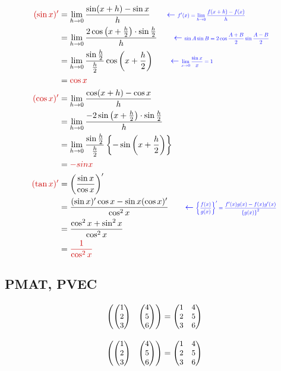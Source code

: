 \documentclass[../main]{subfiles}
\begin{document}
\begin{code}[language=tex]
    \begin{align*}
        \EMM{(\sin x)'} &= \lim_{h\to 0}\frac{\sin(x+h)-\sin x}{h}
        \qquad \EXPRNOTE{f'(x) = \lim_{h\to 0}\frac{f(x+h)-f(x)}{h}} \\
        &= \lim_{h\to 0}\frac{2\cos\left(x+\frac{h}{2}\right)\cdot\sin\frac{h}{2}}{h}
        \qquad \EXPRNOTE{\sin A\sin B = 2\cos\frac{A+B}{2}\sin\frac{A-B}{2}} \\
        &= \lim_{h\to 0}\frac{\sin\frac{h}{2}}{\frac{h}{2}}\cos\left(x+\frac{h}{2}\right)
        \qquad \EXPRNOTE{\lim_{x\to 0}\frac{\sin x}{x} = 1} \\
        &= \EMM{\cos x} \\
        \EMM{(\cos x)'} &= \lim_{h\to 0}\frac{\cos(x+h)-\cos x}{h} \\
        &= \lim_{h\to 0}\frac{-2\sin\left(x+\frac{h}{2}\right)\cdot\sin\frac{h}{2}}{h} \\
        &= \lim_{h\to 0}\frac{\sin\frac{h}{2}}{\frac{h}{2}}
        \left\{-\sin\left(x+\frac{h}{2}\right)\right\} \\
        &= \EMM{-sin x} \\
        \EMM{(\tan x)'} &= \left(\frac{\sin x}{\cos x}\right)' \\
        &= \frac{(\sin x)'\cos x - \sin x(\cos x)'}{\cos^2 x}
        \qquad \EXPRNOTE{
            \left\{
                \frac{f(x)}{g(x)}
            \right\}' = \frac{f'(x)g(x)-f(x)g'(x)}
            {\left\{g(x)\right\}^2}
        } \\
        &= \frac{\cos^2 x + \sin^2 x}{\cos^2 x} \\
        &= \EMM{\frac{1}{\cos^2 x}}
    \end{align*}
\end{code}

\leaderfill
\subsection{PMAT, PVEC}

\[
    {\small\begin{pmatrix}{}{\small\begin{pmatrix}1\\2\\3\end{pmatrix}}&{\small\begin{pmatrix}4\\5\\6\end{pmatrix}}\end{pmatrix}} = 
    {\small\begin{pmatrix}{}1&4\\2&5\\3&6\end{pmatrix}}
\]
\begin{code}[language=tex]
\[
    {\small\begin{pmatrix}{}{\small\begin{pmatrix}1\\2\\3\end{pmatrix}}&{\small\begin{pmatrix}4\\5\\6\end{pmatrix}}\end{pmatrix}} = 
    {\small\begin{pmatrix}{}1&4\\2&5\\3&6\end{pmatrix}}
\]
\end{code}
\end{document}

